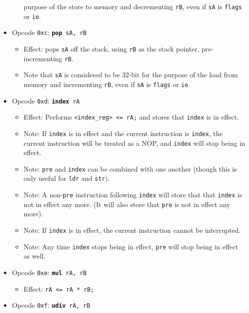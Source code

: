\documentclass{article}
\begin{document}
\begin{itemize}
\begin{itemize}
		purpose of the store to memory and decrementing \texttt{rB},
		even if \texttt{sA} is \texttt{flags} or \texttt{ie}.
		\end{itemize}
	\item Opcode \texttt{0xc}:
		\texttt{\textbf{pop} sA, rB}
		\begin{itemize}
		\item Effect: pops \texttt{sA} off the stack, using
		\texttt{rB} as the stack pointer, pre-incrementing \texttt{rB}.
		\item Note that \texttt{sA} is considered to be 32-bit for the
		purpose of the load from memory and incrementing \texttt{rB},
		even if \texttt{sA} is \texttt{flags} or \texttt{ie}.
		\end{itemize}
	\item Opcode \texttt{0xd}:
		\texttt{\textbf{index} rA}
		\begin{itemize}
		\item Effect: Performs \texttt{<index\_reg> <= rA;} and stores
		that \texttt{index} is in effect.
		\item Note: If \texttt{index} is in effect and the current
		instruction is \texttt{index}, the current instruction will be
		treated as a NOP, and \texttt{index} will stop being in effect.
		\item Note: \texttt{pre} and \texttt{index} can be combined
		with one another (though this is only useful for \texttt{ldr}
		and \texttt{str}).
		\item Note: A non-\texttt{pre} instruction following
		\texttt{index} will store that that \texttt{index} is not in
		effect any more. (It will also store that \texttt{pre} is not
		in effect any more).
		\item Note: If \texttt{index} is in effect, the current
		instruction cannot be interrupted.
		\item Note: Any time \texttt{index} stops being in effect,
		\texttt{pre} will stop being in effect as well.
		\end{itemize}
	\item Opcode \texttt{0xe}:
		\texttt{\textbf{mul} rA, rB}
		\begin{itemize}
		\item Effect: \texttt{rA <= rA * rB;}
		\end{itemize}
	\item Opcode \texttt{0xf}:
		\texttt{\textbf{udiv} rA, rB}
		\begin{itemize}

\end{itemize}
\end{itemize}
\end{document}
